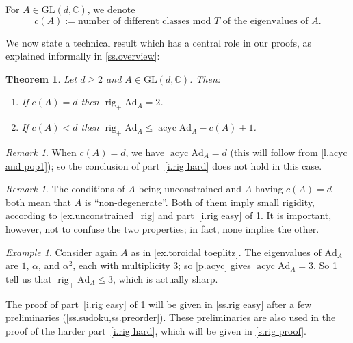 \documentclass[10pt, a4paper]{amsart}
\theoremstyle{plain}
\newtheorem{thm}[lemma]{Theorem}
\theoremstyle{definition}
\theoremstyle{remark}
\theoremstyle{note}
\newtheorem{rem}[lemma]{Remark}
\newtheorem{example}[lemma]{Example}
\numberwithin{equation}{section}
\begin{document}
For $A \in {\mathrm{GL}}(d,{\mathbb{C}})$, we denote
\begin{equation}\label{e.num classes}
c(A) := \text{number of different classes mod $T$ of the eigenvalues of $A$.}
\end{equation}

We now state a technical result
which has a central role in our proofs,
as explained informally in \cref{ss.overview}:

\begin{thm}\label{t.rig}
Let $d \ge 2$ and $A \in {\mathrm{GL}}(d,{\mathbb{C}})$.
Then:
\begin{enumerate}
\item\label{i.rig easy}
If $c(A) = d$ then $\operatorname{rig}_+ {\mathrm{Ad}}_A = 2$.
\item\label{i.rig hard}
If $c(A) < d$ then $\operatorname{rig}_+ {\mathrm{Ad}}_A \le \operatorname{acyc} {\mathrm{Ad}}_A - c(A) + 1$.
\end{enumerate}
\end{thm}

\begin{rem}
When $c(A) = d$, we have $\operatorname{acyc} {\mathrm{Ad}}_A = d$ (this will follow from \cref{l.acyc and pop1});
so the conclusion of part~\ref{i.rig hard} does not hold in this case.
\end{rem}

\begin{rem}
The conditions of $A$ being unconstrained and $A$ having $c(A)=d$ 
both mean that $A$ is ``non-degenerate''.
Both of them imply small rigidity, according to \cref{ex.unconstrained_rig}
and  part~\ref{i.rig easy} of \cref{t.rig}.
It is important, however, not to confuse the two properties;
in fact, none implies the other.
\end{rem}

\begin{example}\label{ex.toroidal toeplitz again}
Consider again $A$ as in \cref{ex.toroidal toeplitz}.
The eigenvalues of ${\mathrm{Ad}}_A$ are $1$, $\alpha$, and $\alpha^2$, each with multiplicity $3$;
so \cref{p.acyc} gives $\operatorname{acyc} {\mathrm{Ad}}_A = 3$.
So \cref{t.rig} tell us that $\operatorname{rig}_+ {\mathrm{Ad}}_A \le 3$,
which is actually sharp.
\end{example}

\medskip

The proof of part~\ref{i.rig easy} of \cref{t.rig} will be given in \cref{ss.rig easy}
after a few preliminaries (\cref{ss.sudoku,ss.preorder}).
These preliminaries are also used in the proof of the harder part~\ref{i.rig hard},
which will be given in \cref{s.rig proof}.
\end{document}
